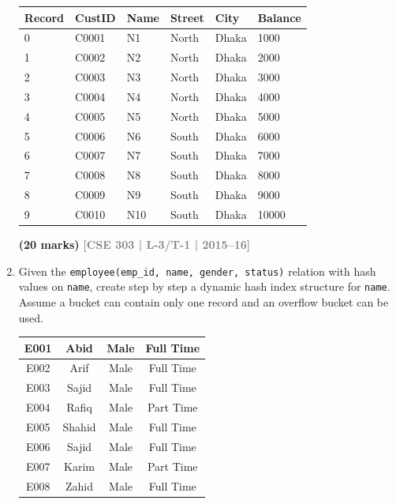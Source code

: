 \documentclass[12pt,a3paper]{article}
\newcommand{\yr}[1]{\hfill\textcolor{gray}{\small\textbf{[#1]}}}
\newcommand{\mk}[1]{\textcolor{orange!70!black}{\small\textbf{(#1 marks)}}}
\begin{document}
\begin{enumerate}
\medskip
\begin{center}
\small
\begin{tabular}{llllll}
\toprule
\textbf{Record} & \textbf{CustID} & \textbf{Name} & \textbf{Street} & \textbf{City} & \textbf{Balance}\\
\midrule
0 & C0001 & N1 & North & Dhaka & 1000\\
1 & C0002 & N2 & North & Dhaka & 2000\\
2 & C0003 & N3 & North & Dhaka & 3000\\
3 & C0004 & N4 & North & Dhaka & 4000\\
4 & C0005 & N5 & North & Dhaka & 5000\\
5 & C0006 & N6 & South & Dhaka & 6000\\
6 & C0007 & N7 & South & Dhaka & 7000\\
7 & C0008 & N8 & South & Dhaka & 8000\\
8 & C0009 & N9 & South & Dhaka & 9000\\
9 & C0010 & N10 & South & Dhaka & 10000\\
\bottomrule
\end{tabular}
\end{center}

\mk{20} \yr{CSE 303 | L-3/T-1 | 2015--16}

\item Given the \texttt{employee(emp\_id, name, gender, status)} relation with hash values on \texttt{name}, create step by step a dynamic hash index structure for \texttt{name}. Assume a bucket can contain only one record and an overflow bucket can be used.


\begin{center}
  \renewcommand{\arraystretch}{1.3} %
    \begin{tabular}{|c|c|c|c|}
        \hline
        E001 & Abid   & Male & Full Time \\ \hline
        E002 & Arif   & Male & Full Time \\ \hline
        E003 & Sajid  & Male & Full Time \\ \hline
        E004 & Rafiq  & Male & Part Time \\ \hline
        E005 & Shahid & Male & Full Time \\ \hline
        E006 & Sajid  & Male & Full Time \\ \hline
        E007 & Karim  & Male & Part Time \\ \hline
        E008 & Zahid  & Male & Full Time \\ \hline
    \end{tabular}
    

\end{center}
\end{enumerate}
\end{document}
